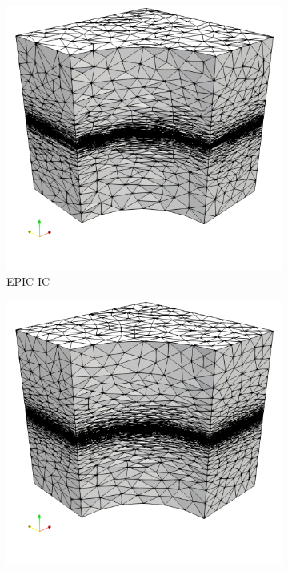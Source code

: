 \documentclass[3p,times,procedia,number]{elsarticle}
\begin{document}
\begin{figure}
\begin{subfigure}{.24\textwidth}
\centering
\includegraphics[width=\textwidth]{epic-ic-cube-cylinder-linear.png}
\caption{EPIC-IC}
\end{subfigure}
\begin{subfigure}{.24\textwidth}
\centering
\includegraphics[width=\textwidth]{epic-ics-cube-cylinder-linear.png}

\end{subfigure}
\end{figure}
\end{document}
